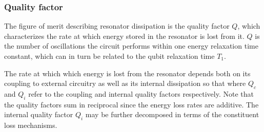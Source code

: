 \vspace*{2em}

\subsubsection{Quality factor}
The figure of merit describing resonator dissipation is the quality factor $Q$,
which characterizes the rate at which energy stored in the resonator is lost from it.  $Q$ is the number of oscillations
the circuit performs within one energy relaxation time constant, which can in turn be related to the qubit relaxation time $T_1$.

The rate at which which energy is lost from the resonator depends both on its coupling to external circuitry as well as its internal dissipation so that
where $Q_c$ and $Q_i$ refer to the coupling and internal quality factors respectively.
Note that the quality factors sum in reciprocal since the energy loss rates are additive.
The internal quality factor $Q_i$ may be further decomposed in terms of the constituent loss mechanisms.

